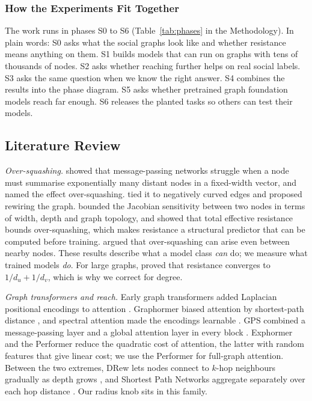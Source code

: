\subsubsection{How the Experiments Fit Together}
The work runs in phases S0 to S6 (Table~\ref{tab:phases} in the Methodology). In plain words: S0 asks what the social graphs look like and whether resistance means anything on them. S1 builds models that can run on graphs with tens of thousands of nodes. S2 asks whether reaching further helps on real social labels. S3 asks the same question when we know the right answer. S4 combines the results into the phase diagram. S5 asks whether pretrained graph foundation models reach far enough. S6 releases the planted tasks so others can test their models.

\subsection{Literature Review}
\textit{Over-squashing.} \citet{alon2021} showed that message-passing networks struggle when a node must summarise exponentially many distant nodes in a fixed-width vector, and named the effect over-squashing. \citet{topping2022} tied it to negatively curved edges and proposed rewiring the graph. \citet{digiovanni2023} bounded the Jacobian sensitivity between two nodes in terms of width, depth and graph topology, and \citet{black2023} showed that total effective resistance bounds over-squashing, which makes resistance a structural predictor that can be computed before training. \citet{mishayev2025} argued that over-squashing can arise even between nearby nodes. These results describe what a model class \emph{can} do; we measure what trained models \emph{do}. For large graphs, \citet{f_vonluxburg2014} proved that resistance converges to $1/d_u+1/d_v$, which is why we correct for degree.

\textit{Graph transformers and reach.} Early graph transformers added Laplacian positional encodings to attention \citep{dwivedi2021}. Graphormer biased attention by shortest-path distance \citep{ying2021}, and spectral attention made the encodings learnable \citep{kreuzer2021}. GPS combined a message-passing layer and a global attention layer in every block \citep{rampasek2022}. Exphormer \citep{shirzad2023} and the Performer \citep{f_choromanski2021} reduce the quadratic cost of attention, the latter with random features that give linear cost; we use the Performer for full-graph attention. Between the two extremes, DRew lets nodes connect to $k$-hop neighbours gradually as depth grows \citep{f_gutteridge2023}, and Shortest Path Networks aggregate separately over each hop distance \citep{f_abboud2022}. Our radius knob sits in this family.

